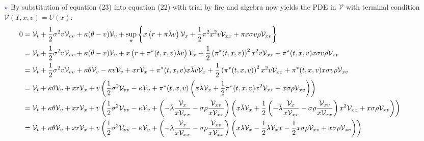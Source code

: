 \documentclass[11pt]{article}
\numberwithin{equation}{section}
\newcommand{\lc}{\left\{}
\newcommand{\rc}{\right\}}
\begin{document}
\newpage
$\textcolor{blue}{\star}$ By substitution of equation (23) into equation (22)
with trial by fire and algebra now yields the PDE in $\mathcal{V}$ with terminal
condition $\mathcal{V}(T,x,v)=U(x)$:
\begin{equation*}
    \hspace*{-1.3cm}
    \begin{aligned}
        0 &= \mathcal{V}_t + \frac{1}{2} \sigma^2 v \mathcal{V}_{vv} + \kappa (\theta - v) \mathcal{V}_v + \sup_\pi \lc x \left ( r + \pi \bar{\lambda}v \right) \mathcal{V}_x + \frac{1}{2} \pi^2 x^2 v \mathcal{V}_{xx} + \pi x \sigma v \rho \mathcal{V}_{xv} \rc \\
        &= \mathcal{V}_t + \frac{1}{2} \sigma^2 v \mathcal{V}_{vv} + \kappa (\theta - v) \mathcal{V}_v + x \left ( r + \pi^* (t, x, v) \bar{\lambda} v\right) \mathcal{V}_x + \frac{1}{2} \left( \pi^* (t, x, v) \right)^2 x^2 v \mathcal{V}_{xx} + \pi^* (t, x, v) x \sigma v \rho \mathcal{V}_{xv} \\
        &= \mathcal{V}_t + \frac{1}{2} \sigma^2 v \mathcal{V}_{vv} + \kappa \theta \mathcal{V}_v - \kappa v \mathcal{V}_v + x r \mathcal{V}_x + \pi^* (t, x, v) x\bar{\lambda}v \mathcal{V}_x + \frac{1}{2} \left( \pi^* (t, x, v) \right)^2 x^2 v \mathcal{V}_{xx} + \pi^* (t, x, v) x \sigma v \rho \mathcal{V}_{xv} \\
        &= \mathcal{V}_t + \kappa \theta \mathcal{V}_v + x r \mathcal{V}_x + v \left( \frac{1}{2} \sigma^2 \mathcal{V}_{vv} - \kappa \mathcal{V}_v + \pi^* (t, x, v) \left( x \bar{\lambda} \mathcal{V}_x + \frac{1}{2} \pi^* (t, x, v) x^2 \mathcal{V}_{xx} + x \sigma \rho \mathcal{V}_{xv} \right) \right) \\
        &= \mathcal{V}_t + \kappa \theta \mathcal{V}_v + x r \mathcal{V}_x + v \left( \frac{1}{2} \sigma^2 \mathcal{V}_{vv} - \kappa \mathcal{V}_v + \left( -\bar{\lambda} \frac{\mathcal{V}_x}{x \mathcal{V}_{xx}} - \sigma \rho \frac{\mathcal{V}_{xv}}{x \mathcal{V}_{xx}} \right) \left ( x \bar{\lambda} \mathcal{V}_x + \frac{1}{2} \left( -\bar{\lambda} \frac{\mathcal{V}_x}{x \mathcal{V}_{xx}} - \sigma \rho \frac{\mathcal{V}_{xv}}{x \mathcal{V}_{xx}} \right) x^2 \mathcal{V}_{xx} + x \sigma \rho \mathcal{V}_{xv} \right) \right )\\
        &=\mathcal{V}_t + \kappa \theta \mathcal{V}_v + x r \mathcal{V}_x + v \left( \frac{1}{2} \sigma^2 \mathcal{V}_{vv} - \kappa \mathcal{V}_v + \left( -\bar{\lambda} \frac{\mathcal{V}_x}{x \mathcal{V}_{xx}} - \sigma \rho \frac{\mathcal{V}_{xv}}{x \mathcal{V}_{xx}} \right) \left ( x \bar{\lambda} \mathcal{V}_x - \frac{1}{2} \bar{\lambda}\mathcal{V}_xx - \frac{1}{2} x\sigma \rho  \mathcal{V}_{xv} + x \sigma \rho \mathcal{V}_{xv} \right) \right )\\

\end{aligned}
\end{equation*}
\end{document}
